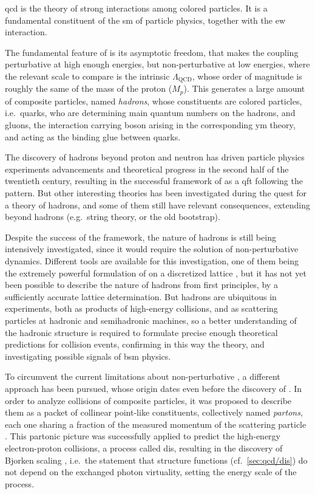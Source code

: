 \acrfull{qcd} is the theory of strong interactions among colored particles.
It is a fundamental constituent of the \acrfull{sm} of particle physics,
together with the \acrfull{ew} interaction.

The fundamental feature of \qcd is its asymptotic freedom, that makes the
coupling perturbative at high enough energies, but non-perturbative at low
energies, where the relevant scale to compare is the intrinsic
$\Lambda_{\text{QCD}}$, whose order of magnitude is roughly the same of the
mass of the proton ($M_p$).
%
This generates a large amount of composite particles, named \textit{hadrons},
whose constituents are colored particles, i.e.\ quarks, who are determining
main quantum numbers on the hadrons, and gluons, the interaction carrying boson
arising in the corresponding \acrfull{ym} theory, and acting as the binding
glue between quarks.

The discovery of hadrons beyond proton and neutron has driven particle physics
experiments advancements and theoretical progress in the second half of the
twentieth century, resulting in the successful framework of \qcd as a
\acrlong{qft} following the \ym pattern.
But other interesting theories has been investigated during the quest for a
theory of hadrons, and some of them still have relevant consequences, extending
beyond hadrons (e.g.\ string theory, or the old bootstrap).

Despite the success of the framework, the nature of hadrons is still being
intensively investigated, since it would require the solution of
non-perturbative \qcd dynamics.
%
Different tools are available for this investigation, one of them being the
extremely powerful formulation of \qcd on a discretized lattice
\cite{Wilson:1974sk}, but it has not yet been possible to describe the nature
of hadrons from first principles, by a sufficiently accurate lattice
determination.
%
But hadrons are ubiquitous in \hep experiments, both as products of high-energy
collisions, and as scattering particles at hadronic and semihadronic machines,
so a better understanding of the hadronic structure is required to formulate
precise enough theoretical predictions for collision events, confirming in this
way the \sm theory, and investigating possible signals of \acrfull{bsm}
physics.

To circumvent the current limitations about non-perturbative \qft, a different
approach has been pursued, whose origin dates even before the discovery of
\qcd.
In order to analyze collisions of composite particles, it was proposed to
describe them as a packet of collinear point-like constituents, collectively
named \textit{partons}, each one sharing a fraction of the measured momentum of
the scattering particle \cite{Feynman:1969wa}.
%
This partonic picture was successfully applied to predict the high-energy
electron-proton collisions, a process called \acrfull{dis}, resulting in the
discovery of Bjorken scaling \cite{Bjorken:1967fb}, i.e.\ the statement that
\dis structure functions (cf.\ \cref{sec:qcd/dis}) do not depend on the
exchanged photon virtuality, setting the energy scale of the process.

